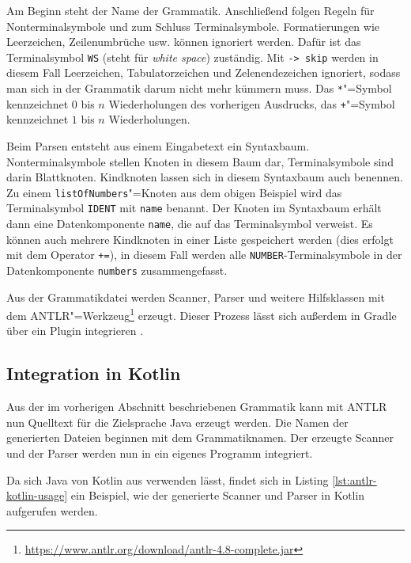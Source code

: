 Am Beginn steht der Name der Grammatik. Anschließend folgen Regeln für Nonterminalsymbole und zum Schluss Terminalsymbole. Formatierungen wie Leerzeichen, Zeilenumbrüche usw. können ignoriert werden. Dafür ist das Terminalsymbol \lstinline{WS} (steht für \emph{white space}) zuständig. Mit \lstinline{-> skip} werden in diesem Fall Leerzeichen, Tabulatorzeichen und Zelenendezeichen ignoriert, sodass man sich in der Grammatik darum nicht mehr kümmern muss. Das \lstinline{*}"=Symbol kennzeichnet $0$ bis $n$ Wiederholungen des vorherigen Ausdrucks, das \lstinline{+}"=Symbol kennzeichnet $1$ bis $n$ Wiederholungen.

Beim Parsen entsteht aus einem Eingabetext ein Syntaxbaum. Nonterminalsymbole stellen Knoten in diesem Baum dar, Terminalsymbole sind darin Blattknoten. Kindknoten lassen sich in diesem Syntaxbaum auch benennen. Zu einem \lstinline{listOfNumbers}"=Knoten aus dem obigen Beispiel wird das Terminalsymbol \lstinline{IDENT} mit \lstinline{name} benannt. Der Knoten im Syntaxbaum erhält dann eine Datenkomponente \lstinline{name}, die auf das Terminalsymbol verweist. Es können auch mehrere Kindknoten in einer Liste gespeichert werden (dies erfolgt mit dem Operator \lstinline{+=}), in diesem Fall werden alle \lstinline{NUMBER}-Terminalsymbole in der Datenkomponente \lstinline{numbers} zusammengefasst.

Aus der Grammatikdatei werden Scanner, Parser und weitere Hilfsklassen mit dem ANTLR"=Werkzeug\footnote{\url{https://www.antlr.org/download/antlr-4.8-complete.jar}} erzeugt. Dieser Prozess lässt sich außerdem in Gradle über ein Plugin integrieren \cite{GradleANTLRPlugin}.

\subsection{Integration in Kotlin}

Aus der im vorherigen Abschnitt beschriebenen Grammatik kann mit ANTLR nun Quelltext für die Zielsprache Java erzeugt werden. Die Namen der generierten Dateien beginnen mit dem Grammatiknamen. Der erzeugte Scanner und der Parser werden nun in ein eigenes Programm integriert.

Da sich Java von Kotlin aus verwenden lässt, findet sich in Listing \ref{lst:antlr-kotlin-usage} ein Beispiel, wie der generierte Scanner und Parser in Kotlin aufgerufen werden. 



